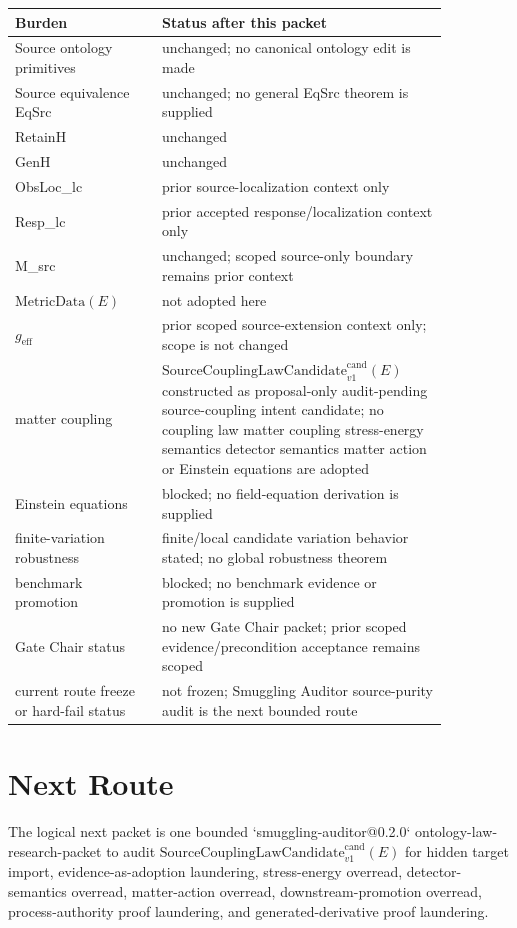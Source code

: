 \documentclass[11pt]{article}
\newcommand{\MetricData}{\mathrm{MetricData}}
\newcommand{\geff}{g_{\mathrm{eff}}}
\newcommand{\SourceCoupCand}{\mathrm{SourceCouplingLawCandidate}^{\mathrm{cand}}_{v1}}
\begin{document}
\begin{longtable}{p{0.30\linewidth}p{0.56\linewidth}}
\toprule
Burden & Status after this packet \\
\midrule
Source ontology primitives & unchanged; no canonical ontology edit is made \\
Source equivalence EqSrc & unchanged; no general EqSrc theorem is supplied \\
RetainH & unchanged \\
GenH & unchanged \\
ObsLoc\_lc & prior source-localization context only \\
Resp\_lc & prior accepted response/localization context only \\
M\_src & unchanged; scoped source-only boundary remains prior context \\
\(\MetricData(E)\) & not adopted here \\
\(\geff\) & prior scoped source-extension context only; scope is not changed \\
matter coupling & \(\SourceCoupCand(E)\) constructed as proposal-only audit-pending source-coupling intent candidate; no coupling law matter coupling stress-energy semantics detector semantics matter action or Einstein equations are adopted \\
Einstein equations & blocked; no field-equation derivation is supplied \\
finite-variation robustness & finite/local candidate variation behavior stated; no global robustness theorem \\
benchmark promotion & blocked; no benchmark evidence or promotion is supplied \\
Gate Chair status & no new Gate Chair packet; prior scoped evidence/precondition acceptance remains scoped \\
current route freeze or hard-fail status & not frozen; Smuggling Auditor source-purity audit is the next bounded route \\
\bottomrule
\end{longtable}

\section{Next Route}

The logical next packet is one bounded `smuggling-auditor@0.2.0`
ontology-law-research-packet to audit \(\SourceCoupCand(E)\) for hidden target
import, evidence-as-adoption laundering, stress-energy overread,
detector-semantics overread, matter-action overread, downstream-promotion
overread, process-authority proof laundering, and generated-derivative proof
laundering.
\end{document}
